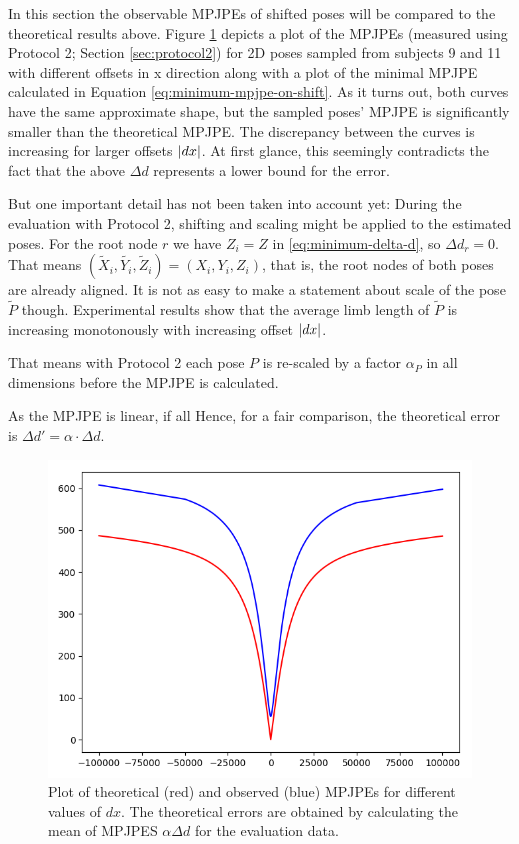 In this section the observable MPJPEs of shifted poses will be compared to the theoretical results above. 
Figure \ref{fig:x-shift-error} depicts a plot of the MPJPEs (measured using Protocol 2; Section \ref{sec:protocol2}) for 2D poses sampled from subjects 9 and 11 with different offsets in x direction along with a plot of the minimal MPJPE calculated in Equation \eqref{eq:minimum-mpjpe-on-shift}.
As it turns out, both curves have the same approximate shape, but the sampled poses' MPJPE is significantly smaller than the theoretical MPJPE.
The discrepancy between the curves is increasing for larger offsets $\abs{dx}$.
At first glance, this seemingly contradicts the fact that the above $\Delta d$ represents a lower bound for the error.

But one important detail has not been taken into account yet:
During the evaluation with Protocol 2, shifting and scaling might be applied to the estimated poses. 
For the root node $r$ we have $Z_i = Z$ in \eqref{eq:minimum-delta-d}, so $\Delta d_r = 0$. That means $(\widetilde{X}_i, \widetilde{Y_i}, \widetilde{Z}_i) = (X_i, Y_i, Z_i)$, that is, the root nodes of both poses are already aligned.
It is not as easy to make a statement about scale of the pose $\widetilde{P}$ though.
Experimental results show that the average limb length of $\widetilde{P}$ is increasing monotonously with increasing offset $\abs{dx}$.

That means with Protocol 2 each pose $P$ is re-scaled by a factor $\alpha_P$ in all dimensions before the MPJPE is calculated.

As the MPJPE is linear, if all 
Hence, for a fair comparison, the theoretical error is $\Delta d' = \alpha \cdot \Delta d$.

\begin{figure}[ht]	
	\centering
	\includegraphics[scale=0.5]{figures/x_shift_error.png}
	\caption{Plot of theoretical (red) and observed (blue) MPJPEs for different values of $dx$. 
		The theoretical errors are obtained by calculating the mean of MPJPES $\alpha \Delta d$ for the evaluation data.}
	\label{fig:x-shift-error}
\end{figure}

